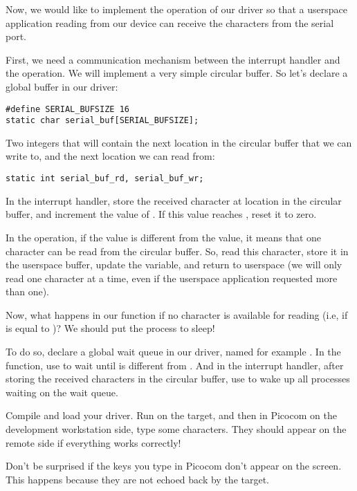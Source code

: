 Now, we would like to implement the  operation of our
driver so that a userspace application reading from our device can
receive the characters from the serial port.

First, we need a communication mechanism between the interrupt handler
and the  operation. We will implement a very simple
circular buffer. So let's declare a global buffer in our driver:

\begin{verbatim}
#define SERIAL_BUFSIZE 16
static char serial_buf[SERIAL_BUFSIZE];
\end{verbatim}

Two integers that will contain the next location in the circular
buffer that we can write to, and the next location we can read from:

\begin{verbatim}
static int serial_buf_rd, serial_buf_wr;
\end{verbatim}

In the interrupt handler, store the received character at location
 in the circular buffer, and increment the value
of . If this value reaches ,
reset it to zero.

In the  operation, if the  value is
different from the  value, it means that one
character can be read from the circular buffer. So, read this
character, store it in the userspace buffer, update the
 variable, and return to userspace (we will only
read one character at a time, even if the userspace application
requested more than one).

Now, what happens in our  function if no character is
available for reading (i.e, if  is equal to
)? We should put the process to sleep!

To do so, declare a global wait queue in our driver, named for example
. In the  function, use
 to wait until 
is different from . And in the interrupt handler,
after storing the received characters in the circular buffer, use
 to wake up all processes waiting on the wait queue.

Compile and load your driver. Run  on the
target, and then in Picocom on the development workstation side, type
some characters. They should appear on the remote side if everything
works correctly!

Don't be surprised if the keys you type in Picocom don't appear on the
screen. This happens because they are not echoed back by the target.
